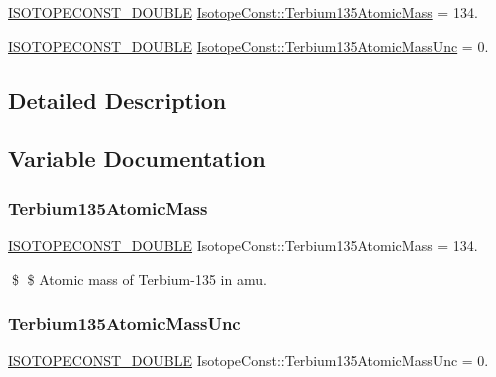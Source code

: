 \begin{DoxyCompactItemize}
\item 
\mbox{\hyperlink{group___isotope_const-_macros_ga8f45a7272ce02c0b4c65c44636ed719a}{I\+S\+O\+T\+O\+P\+E\+C\+O\+N\+S\+T\+\_\+\+D\+O\+U\+B\+LE}} \mbox{\hyperlink{group___isotope_const-_terbium-_tb135_ga28bb95d77aa1e74ca4fab8d900143f05}{Isotope\+Const\+::\+Terbium135\+Atomic\+Mass}} = 134.
\item 
\mbox{\hyperlink{group___isotope_const-_macros_ga8f45a7272ce02c0b4c65c44636ed719a}{I\+S\+O\+T\+O\+P\+E\+C\+O\+N\+S\+T\+\_\+\+D\+O\+U\+B\+LE}} \mbox{\hyperlink{group___isotope_const-_terbium-_tb135_ga4bcd140dcf1c235a0011f21652af1978}{Isotope\+Const\+::\+Terbium135\+Atomic\+Mass\+Unc}} = 0.
\end{DoxyCompactItemize}


\subsection{Detailed Description}


\subsection{Variable Documentation}
\mbox{\label{group___isotope_const-_terbium-_tb135_ga28bb95d77aa1e74ca4fab8d900143f05}} 
\subsubsection{\texorpdfstring{Terbium135\+Atomic\+Mass}{Terbium135AtomicMass}}
{\footnotesize\ttfamily \mbox{\hyperlink{group___isotope_const-_macros_ga8f45a7272ce02c0b4c65c44636ed719a}{I\+S\+O\+T\+O\+P\+E\+C\+O\+N\+S\+T\+\_\+\+D\+O\+U\+B\+LE}} Isotope\+Const\+::\+Terbium135\+Atomic\+Mass = 134.}

\$ \$ Atomic mass of Terbium-\/135 in amu. \mbox{\label{group___isotope_const-_terbium-_tb135_ga4bcd140dcf1c235a0011f21652af1978}} 
\subsubsection{\texorpdfstring{Terbium135\+Atomic\+Mass\+Unc}{Terbium135AtomicMassUnc}}
{\footnotesize\ttfamily \mbox{\hyperlink{group___isotope_const-_macros_ga8f45a7272ce02c0b4c65c44636ed719a}{I\+S\+O\+T\+O\+P\+E\+C\+O\+N\+S\+T\+\_\+\+D\+O\+U\+B\+LE}} Isotope\+Const\+::\+Terbium135\+Atomic\+Mass\+Unc = 0.}

